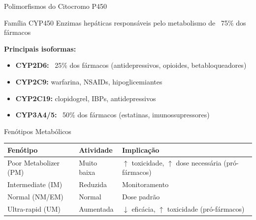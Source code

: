 \begin{frame}{Polimorfismos do Citocromo P450}
\begin{block}{Família CYP450}
Enzimas hepáticas responsáveis pelo metabolismo de ~75\% dos fármacos

\textbf{Principais isoformas:}
\begin{itemize}
    \item \textbf{CYP2D6:} ~25\% dos fármacos (antidepressivos, opioides, betabloqueadores)
    \item \textbf{CYP2C9:} warfarina, NSAIDs, hipoglicemiantes
    \item \textbf{CYP2C19:} clopidogrel, IBPs, antidepressivos
    \item \textbf{CYP3A4/5:} ~50\% dos fármacos (estatinas, imunossupressores)
\end{itemize}
\end{block}

\vspace{0.3cm}

\begin{block}{Fenótipos Metabólicos}
\begin{center}
\begin{tabular}{lll}
\toprule
\textbf{Fenótipo} & \textbf{Atividade} & \textbf{Implicação} \\
\midrule
Poor Metabolizer (PM) & Muito baixa & $\uparrow$ toxicidade, $\uparrow$ dose necessária (pró-fármacos) \\
Intermediate (IM) & Reduzida & Monitoramento \\
Normal (NM/EM) & Normal & Dose padrão \\
Ultra-rapid (UM) & Aumentada & $\downarrow$ eficácia, $\uparrow$ toxicidade (pró-fármacos) \\
\bottomrule
\end{tabular}
\end{center}
\end{block}
\end{frame}

